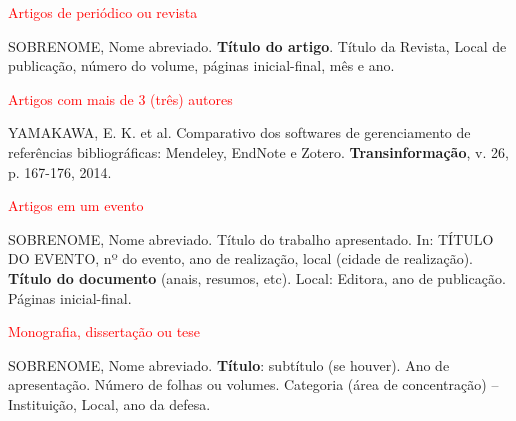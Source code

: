\documentclass[12pt, a4paper]{article}
\begin{document}
\noindent \textcolor{red}{Artigos de periódico ou revista}
\begin{flushleft}
\singlespacing
\noindent 
SOBRENOME, Nome abreviado. \textbf{Título do artigo}. Título da Revista, Local de publicação, número do volume, páginas inicial-final, mês e ano.
\end{flushleft}
\textcolor{red}{Artigos com mais de 3 (três) autores}
\begin{flushleft}
\singlespacing
\noindent 
YAMAKAWA, E. K. et al. Comparativo dos softwares de gerenciamento de referências bibliográficas: Mendeley, EndNote e Zotero. \textbf{Transinformação}, v. 26, p. 167-176, 2014.
\end{flushleft}
\textcolor{red}{Artigos em um evento}
\begin{flushleft}
\singlespacing
\noindent 
SOBRENOME, Nome abreviado. Título do trabalho apresentado. In: TÍTULO DO EVENTO, nº do evento, ano de realização, local (cidade de realização). \textbf{Título do documento} (anais, resumos, etc). Local: Editora, ano de publicação. Páginas inicial-final.
\end{flushleft}
\textcolor{red}{Monografia, dissertação ou tese}
\begin{flushleft}
\singlespacing
\noindent SOBRENOME, Nome abreviado. \textbf{Título}: subtítulo (se houver). Ano de apresentação. Número de folhas ou volumes. Categoria (área de concentração) – Instituição, Local, ano da defesa.
\end{flushleft}

\end{document}
